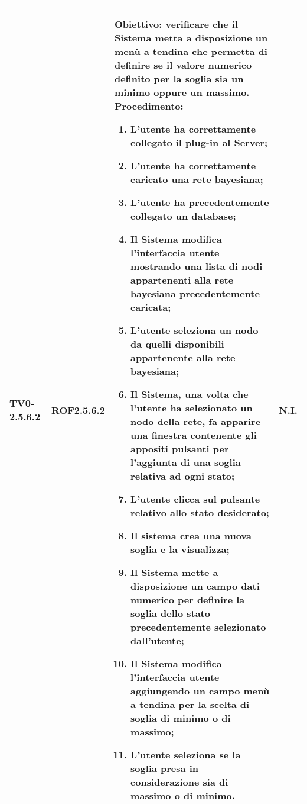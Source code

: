 \begin{longtable}{|C{.15\textwidth}|C{.13\textwidth}|m{.65\textwidth}|C{.08\textwidth}|}
TV0-2.5.6.2 & ROF2.5.6.2 &
	\textbf{Obiettivo}: verificare che il Sistema metta a disposizione un menù a tendina che permetta di definire se il valore numerico definito per la soglia sia un minimo oppure un massimo. \newline
	\textbf{Procedimento}:
	\begin{enumerate}
		\setlength\itemsep{0pt}
		\item L'utente ha correttamente collegato il plug-in al Server;
		\item L'utente ha correttamente caricato una rete bayesiana;
		\item L'utente ha precedentemente collegato un database;
		\item Il Sistema modifica l'interfaccia utente mostrando una lista di nodi appartenenti alla rete bayesiana precedentemente caricata;
		\item L'utente seleziona un nodo da quelli disponibili appartenente alla rete bayesiana;
		\item Il Sistema, una volta che l'utente ha selezionato un nodo della rete, fa apparire una finestra contenente gli appositi pulsanti per l'aggiunta di una soglia relativa ad ogni stato;
		\item L'utente clicca sul pulsante relativo allo stato desiderato;
		\item Il sistema crea una nuova soglia e la visualizza;
		\item Il Sistema mette a disposizione un campo dati numerico per definire la soglia dello stato precedentemente selezionato dall'utente;
		\item Il Sistema modifica l'interfaccia utente aggiungendo un campo menù a tendina per la scelta di soglia di minimo o di massimo;
		\item L'utente seleziona se la soglia presa in considerazione sia di massimo o di minimo.
	\end{enumerate}
	& N.I. \\
\hline


\end{longtable}
